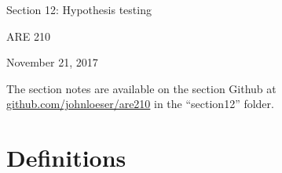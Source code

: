 \documentclass[12pt,english]{article}
\begin{document}
\begin{center}
{\Large{}Section 12: Hypothesis testing}
\par\end{center}{\Large \par}

\begin{center}
ARE 210
\par\end{center}

\begin{center}
November 21, 2017
\par\end{center}

The section notes are available on the section Github at \href{github.com/johnloeser/are210}{github.com/johnloeser/are210} in the ``section12'' folder.

\section{Definitions}
\end{document}

